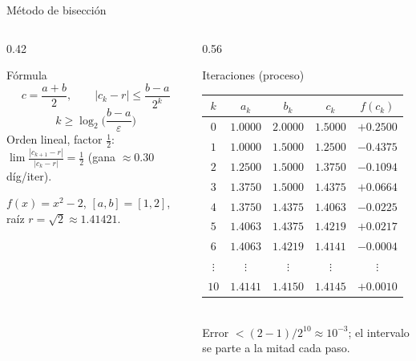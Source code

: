 \documentclass[aspectratio=169,10pt]{beamer}
\begin{document}
\begin{frame}{Método de bisección}
\begin{columns}[T]
\begin{column}{0.42\textwidth}
\begin{cardidea}{Fórmula}{\faSuperscript}
$$c=\frac{a+b}{2},\qquad |c_k-r|\le\frac{b-a}{2^{k}}$$
$$k\ge\log_2\!\Big(\frac{b-a}{\varepsilon}\Big)$$
{\footnotesize Orden lineal, factor $\tfrac12$: $\lim\frac{|c_{k+1}-r|}{|c_k-r|}=\tfrac12$ (gana $\approx0.30$ díg/iter).}
\end{cardidea}
\vspace{1mm}
\begin{cardnota}[\faListOl]
{\footnotesize $f(x)=x^2-2$, $[a,b]=[1,2]$, raíz $r=\sqrt2\approx1.41421$.}
\end{cardnota}
\end{column}
\begin{column}{0.56\textwidth}
\begin{cardgear}{Iteraciones (proceso)}{\faTable}
\centering
{\footnotesize\renewcommand{\arraystretch}{1.13}\setlength{\tabcolsep}{4pt}
\begin{tabular}{c|cccc}
$k$ & $a_k$ & $b_k$ & $c_k$ & $f(c_k)$\\\hline
$0$&$1.0000$&$2.0000$&$1.5000$&$+0.2500$\\
$1$&$1.0000$&$1.5000$&$1.2500$&$-0.4375$\\
$2$&$1.2500$&$1.5000$&$1.3750$&$-0.1094$\\
$3$&$1.3750$&$1.5000$&$1.4375$&$+0.0664$\\
$4$&$1.3750$&$1.4375$&$1.4063$&$-0.0225$\\
$5$&$1.4063$&$1.4375$&$1.4219$&$+0.0217$\\
$6$&$1.4063$&$1.4219$&$1.4141$&$-0.0004$\\
$\vdots$&$\vdots$&$\vdots$&$\vdots$&$\vdots$\\
$10$&$1.4141$&$1.4150$&$1.4145$&$+0.0010$\\
\end{tabular}}\\[1mm]
{\footnotesize Error $<(2{-}1)/2^{10}\approx10^{-3}$; el intervalo se parte a la mitad cada paso.}
\end{cardgear}
\end{column}
\end{columns}
\end{frame}
\end{document}
